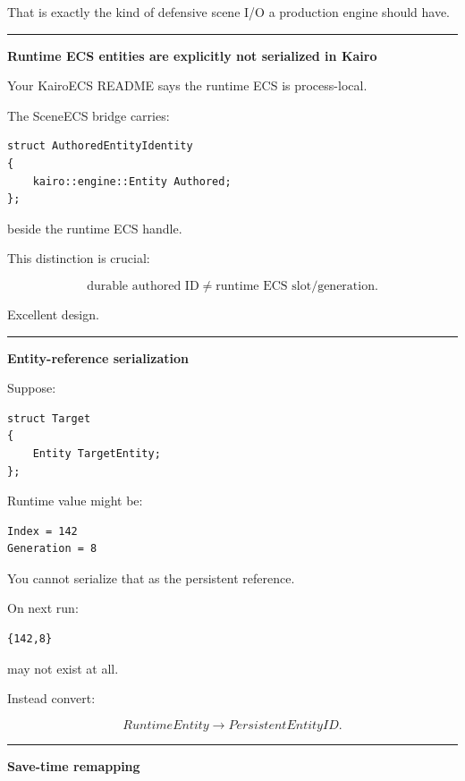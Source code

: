 That is exactly the kind of defensive scene I/O a production engine should have.

\begin{center}\rule{0.5\linewidth}{0.5pt}\end{center}

\textbf{Runtime ECS entities are explicitly not serialized in Kairo}

Your KairoECS README says the runtime ECS is process-local.

The SceneECS bridge carries:

\begin{verbatim}
struct AuthoredEntityIdentity
{
    kairo::engine::Entity Authored;
};
\end{verbatim}

beside the runtime ECS handle.

This distinction is crucial:

\[
\boxed{
\text{durable authored ID}
\neq
\text{runtime ECS slot/generation}.
}
\]

Excellent design.

\begin{center}\rule{0.5\linewidth}{0.5pt}\end{center}

\textbf{Entity-reference serialization}

Suppose:

\begin{verbatim}
struct Target
{
    Entity TargetEntity;
};
\end{verbatim}

Runtime value might be:

\begin{verbatim}
Index = 142
Generation = 8
\end{verbatim}

You cannot serialize that as the persistent reference.

On next run:

\begin{verbatim}
{142,8}
\end{verbatim}

may not exist at all.

Instead convert:

\[
RuntimeEntity
\rightarrow
PersistentEntityID.
\]

\begin{center}\rule{0.5\linewidth}{0.5pt}\end{center}

\textbf{Save-time remapping}

